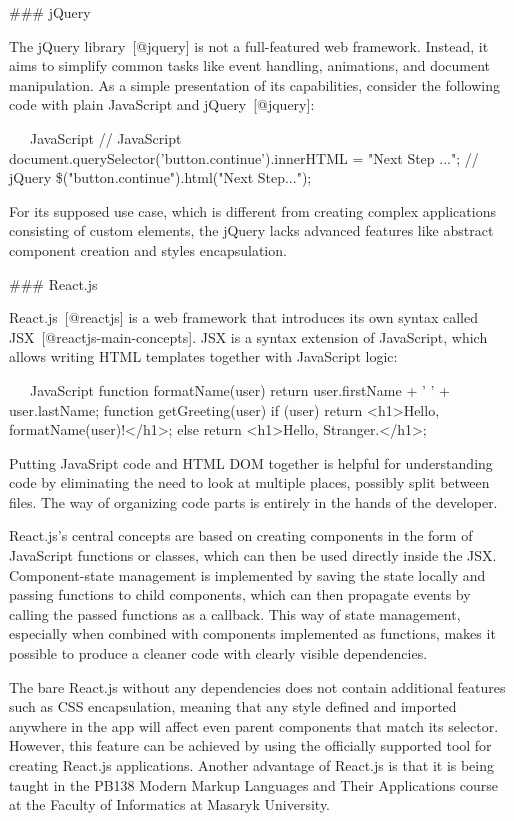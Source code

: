 \documentclass[
  digital, %
  oneside, %
  lof,     %
  nolot,     %
]{fithesis4}
\begin{document}
### jQuery

The jQuery library~[@jquery] is not a full-featured web framework. Instead, it aims to simplify common tasks like event handling, animations, and document manipulation. As a simple presentation of its capabilities, consider the following code with plain JavaScript and jQuery~[@jquery]:

~~~JavaScript
// JavaScript
document.querySelector('button.continue').innerHTML = "Next Step ...";
// jQuery
\$("button.continue").html("Next Step...");
~~~

For its supposed use case, which is different from creating complex applications consisting of custom elements, the jQuery lacks advanced features like abstract component creation and styles encapsulation.

### React.js

React.js~[@reactjs] is a web framework that introduces its own syntax called JSX~[@reactjs-main-concepts]. JSX is a syntax extension of JavaScript, which allows writing \acrshort{HTML} templates together with JavaScript logic:

~~~JavaScript
function formatName(user) {
  return user.firstName + ' ' + user.lastName;
}
function getGreeting(user) {
  if (user) return <h1>Hello, {formatName(user)}!</h1>;
  else return <h1>Hello, Stranger.</h1>;
}
~~~

Putting JavaSript code and \acrshort{HTML} \acrshort{DOM} together is helpful for understanding code by eliminating the need to look at multiple places, possibly split between files. The way of organizing code parts is entirely in the hands of the developer.

React.js's central concepts are based on creating components in the form of JavaScript functions or classes, which can then be used directly inside the JSX. Component-state management is implemented by saving the state locally and passing functions to child components, which can then propagate events by calling the passed functions as a callback. This way of state management, especially when combined with components implemented as functions, makes it possible to produce a cleaner code with clearly visible dependencies.

The bare React.js without any dependencies does not contain additional features such as \acrshort{CSS} encapsulation, meaning that any style defined and imported anywhere in the app will affect even parent components that match its selector. However, this feature can be achieved by using the officially supported tool for creating React.js applications. Another advantage of React.js is that it is being taught in the PB138 Modern Markup Languages and Their Applications course at the Faculty of Informatics at Masaryk University.
\end{document}
